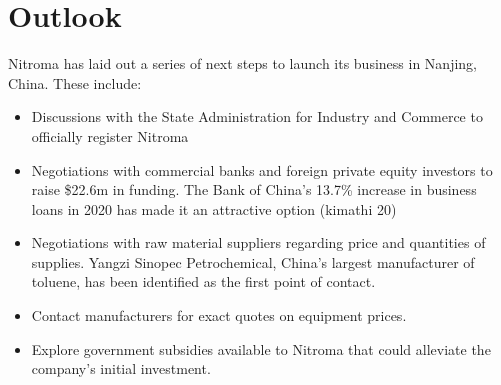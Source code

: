 \section{Outlook}
Nitroma has laid out a series of next steps to launch its business in Nanjing, China. These include:
\begin{itemize}
    \item Discussions with the State Administration for Industry and Commerce to officially register Nitroma 
    \item Negotiations with commercial banks and foreign private equity investors to raise \$22.6m in funding. The Bank of China’s 13.7\% increase in business loans in 2020 has made it an attractive option (kimathi 20)
    \item Negotiations with raw material suppliers regarding price and quantities of supplies. Yangzi Sinopec Petrochemical, China’s largest manufacturer of toluene, has been identified as the first point of contact\cite{sinopec_group_sinopec_2014}.
    \item Contact manufacturers for exact quotes on equipment prices.
    \item Explore government subsidies available to Nitroma that could alleviate the company’s initial investment. 
\end{itemize}




